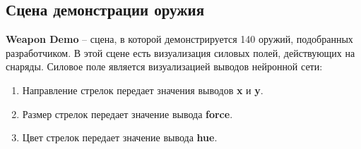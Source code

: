 \subsection{Сцена демонстрации оружия}

\textbf{Weapon Demo} -- сцена, в которой демонстрируется 140 оружий, подобранных разработчиком. В этой сцене есть визуализация силовых полей, действующих на снаряды. Силовое поле является визуализацией выводов нейронной сети:

\begin{enumerate}
    \item Направление стрелок передает значения выводов \textbf{x} и \textbf{y}.
    \item Размер стрелок передает значение вывода {\small \textbf{force}}.
    \item Цвет стрелок передает значение вывода {\small \textbf{hue}}.
\end{enumerate}

